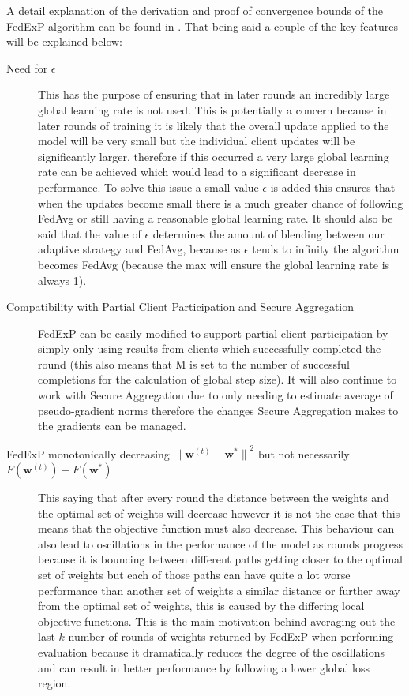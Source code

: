 \documentclass{article}
\begin{document}
A detail explanation of the derivation and proof of convergence bounds of the FedExP algorithm can be found in \cite{FedExP}.  That being said a couple of the key features will be explained below:

\begin{description}
\item[Need for $\epsilon$]{This has the purpose of ensuring that in later rounds an incredibly large global learning rate is not used.  This is potentially a concern because in later rounds of training it is likely that the overall update applied to the model will be very small but the individual client updates will be significantly larger, therefore if this occurred a very large global learning rate can be achieved which would lead to a significant decrease in performance.  To solve this issue a small value $\epsilon$ is added this ensures that when the updates become small there is a much greater chance of following FedAvg or still having a reasonable global learning rate.  It should also be said that the value of $\epsilon$ determines the amount of blending between our adaptive strategy and FedAvg, because as $\epsilon$ tends to infinity the algorithm becomes FedAvg (because the max will ensure the global learning rate is always 1).}

\item[Compatibility with Partial Client Participation and Secure Aggregation]{FedExP can be easily modified to support partial client participation by simply only using results from clients which successfully completed the round (this also means that M is set to the number of successful completions for the calculation of global step size).  It will also continue to work with Secure Aggregation due to only needing to estimate average of pseudo-gradient norms therefore the changes Secure Aggregation makes to the gradients can be managed.}

\item[FedExP monotonically decreasing ${\lVert\textbf{w}^{(t)} - \textbf{w}^*\rVert}^2$ but not necessarily $F(\textbf{w}^{(t)}) - F(\textbf{w}^*)$]{This saying that after every round the distance between the weights and the optimal set of weights will decrease however it is not the case that this means that the objective function must also decrease.  This behaviour can also lead to oscillations in the performance of the model as rounds progress because it is bouncing between different paths getting closer to the optimal set of weights but each of those paths can have quite a lot worse performance than another set of weights a similar distance or further away from the optimal set of weights, this is caused by the differing local objective functions.  This is the main motivation behind averaging out the last $k$ number of rounds of weights returned by FedExP when performing evaluation because it dramatically reduces the degree of the oscillations and can result in better performance by following a lower global loss region.}

\end{description}
\end{document}
